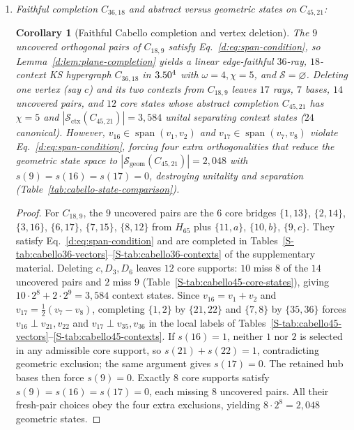\documentclass[aps,pra,reprint,superscriptaddress,longbibliography,nofootinbib,floatfix,10pt]{revtex4-2}
\newtheorem{corollary}[theorem]{Corollary}
\theoremstyle{definition}\newtheorem{definition}[theorem]{Definition}
\theoremstyle{remark}\newtheorem{remark}[theorem]{Remark}
\newcommand{\Sc}{\mathcal S}\newcommand{\Cc}{\mathcal C}
\DeclareMathOperator{\spanop}{span}\DeclareMathOperator{\rank}{rank}
\begin{document}
\begin{enumerate}
\item \emph{Faithful completion $C_{36,18}$ and abstract versus geometric states on $C_{45,21}$:}
\begin{corollary}[Faithful Cabello completion and vertex deletion]\label{cor:cabello36}
The $9$ uncovered orthogonal pairs of $C_{18,9}$ satisfy Eq.~\eqref{d:eq:span-condition}, so Lemma~\ref{d:lem:plane-completion} yields a linear edge-faithful $36$-ray, $18$-context KS hypergraph $C_{36,18}$ in $3.50^4$ with $\omega=4,\chi=5$, and $\Sc=\varnothing$. Deleting one vertex (say $c$) and its two contexts from $C_{18,9}$ leaves $17$ rays, $7$ bases, $14$ uncovered pairs, and $12$ core states whose abstract completion $C_{45,21}$ has $\chi=5$ and $|\Sc_{\mathrm{ctx}}(C_{45,21})|=3{,}584$ unital separating context states ($24$ canonical). However, $v_{16}\in\spanop(v_1,v_2)$ and $v_{17}\in\spanop(v_7,v_8)$ violate Eq.~\eqref{d:eq:span-condition}, forcing four extra orthogonalities that reduce the geometric state space to $|\Sc_{\mathrm{geom}}(C_{45,21})|=2{,}048$ with $s(9)=s(16)=s(17)=0$, destroying unitality and separation (Table~\ref{tab:cabello-state-comparison}).
\end{corollary}
\begin{proof}
For $C_{18,9}$, the $9$ uncovered pairs are the $6$ core bridges $\{1,13\}$, $\{2,14\}$, $\{3,16\}$, $\{6,17\}$, $\{7,15\}$, $\{8,12\}$ from $H_{65}$ plus $\{11,a\}$, $\{10,b\}$, $\{9,c\}$. They satisfy Eq.~\eqref{d:eq:span-condition} and are completed in Tables~\ref{S-tab:cabello36-vectors}--\ref{S-tab:cabello36-contexts} of the supplementary material. Deleting $c,D_3,D_6$ leaves $12$ core supports: $10$ miss $8$ of the $14$ uncovered pairs and $2$ miss $9$ (Table~\ref{S-tab:cabello45-core-states}), giving $10\cdot 2^8+2\cdot 2^9=3{,}584$ context states. Since $v_{16}=v_1+v_2$ and $v_{17}=\frac12(v_7-v_8)$, completing $\{1,2\}$ by $\{21,22\}$ and $\{7,8\}$ by $\{35,36\}$ forces $v_{16}\perp v_{21},v_{22}$ and $v_{17}\perp v_{35},v_{36}$ in the local labels of Tables~\ref{S-tab:cabello45-vectors}--\ref{S-tab:cabello45-contexts}. If $s(16)=1$, neither $1$ nor $2$ is selected in any admissible core support, so $s(21)+s(22)=1$, contradicting geometric exclusion; the same argument gives $s(17)=0$. The retained hub bases then force $s(9)=0$. Exactly $8$ core supports satisfy $s(9)=s(16)=s(17)=0$, each missing $8$ uncovered pairs. All their fresh-pair choices obey the four extra exclusions, yielding $8\cdot 2^8=2{,}048$ geometric states.
\end{proof}
\end{enumerate}
\end{document}
